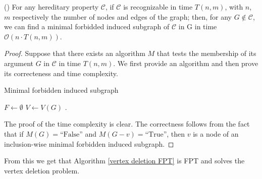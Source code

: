 \documentclass{article}
\begin{document}
    \begin{prop} \label{FPT-prop_1} (\cite{FPT-algos})
        For any hereditary property $\mathcal{C}$,
        if $\mathcal{C}$ is recognizable
        in time $T\left(n, m\right)$, with
        $n$, $m$ respectively the number of nodes and edges
        of the graph; then, for any $G \not \in \mathcal{C}$,
        we can find a minimal forbidded induced
        subgraph of $\mathcal{C}$ in G in time 
        $\mathcal{O} \left(n \cdot T\left(n, m\right)\right)$.  \end{prop}
    \begin{proof} 
        Suppose that there exists an algorithm $M$ that tests
        the membership of its argument $G$ in $\mathcal{C}$ in time
        $T\left(n, m\right)$.
        We first provide an algorithm and then prove its correcteness
        and time complexity.

        \begin{algorithm} \label{forbid subgraph}
            \caption{Minimal forbidden induced subgraph}
           

            $F \gets \emptyset$\;
            $V \gets V\left(G\right)$\;
            .
        \end{algorithm}
    The proof of the time complexity is clear.  
    The correctness follows from the fact that if
    $M\left(G\right) = \text{``False''}$ and $M\left(G - v\right) = \text{``True''}$,
    then $v$ is a node of an inclusion-wise minimal forbidden induced subgraph.
    \end{proof}
    
    From this we get that Algorithm \ref{vertex deletion FPT}
    is FPT and solves the vertex deletion problem. 
    
\end{document}
